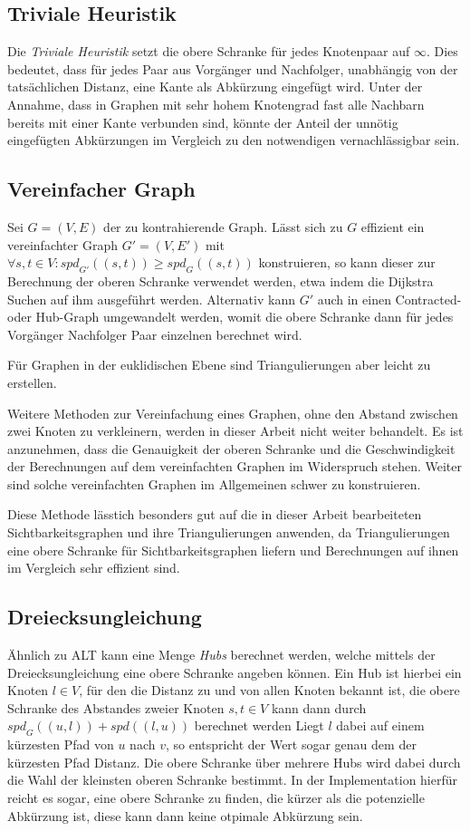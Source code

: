 \subsection{Triviale Heuristik}
Die \emph{Triviale Heuristik} setzt die obere Schranke für jedes Knotenpaar auf $\infty$.
Dies bedeutet, dass für jedes Paar aus Vorgänger und Nachfolger, unabhängig von der tatsächlichen Distanz, eine Kante als Abkürzung eingefügt wird.
Unter der Annahme, dass in Graphen mit sehr hohem Knotengrad fast alle Nachbarn bereits mit einer Kante verbunden sind, könnte der Anteil der unnötig eingefügten Abkürzungen im Vergleich zu den notwendigen vernachlässigbar sein.

\subsection{Vereinfacher Graph}
Sei $G = (V, E)$ der zu kontrahierende Graph.
Lässt sich zu $G$ effizient ein vereinfachter Graph $G' = (V, E')$ mit $\forall s, t \in V \colon {spd}_{G'} ((s, t)) \geq {spd}_{G} ((s, t))$ konstruieren, so kann dieser zur Berechnung der oberen Schranke verwendet werden, etwa indem die Dijkstra Suchen auf ihm ausgeführt werden.
Alternativ kann $G'$ auch in einen Contracted- oder Hub-Graph umgewandelt werden, womit die obere Schranke dann für jedes Vorgänger Nachfolger Paar einzelnen berechnet wird.

Für Graphen in der euklidischen Ebene sind Triangulierungen aber leicht zu erstellen.

Weitere Methoden zur Vereinfachung eines Graphen, ohne den Abstand zwischen zwei Knoten zu verkleinern, werden in dieser Arbeit nicht weiter behandelt.
Es ist anzunehmen, dass die Genauigkeit der oberen Schranke und die Geschwindigkeit der Berechnungen auf dem vereinfachten Graphen im Widerspruch stehen.
Weiter sind solche vereinfachten Graphen im Allgemeinen schwer zu konstruieren.

Diese Methode lässtich besonders gut auf die in dieser Arbeit bearbeiteten Sichtbarkeitsgraphen und ihre Triangulierungen anwenden, da Triangulierungen eine obere Schranke für Sichtbarkeitsgraphen liefern und Berechnungen auf ihnen im Vergleich sehr effizient sind.

\subsection{Dreiecksungleichung}
Ähnlich zu ALT\cite{goldberg2005computing} kann eine Menge \emph{Hubs} berechnet werden, welche mittels der Dreiecksungleichung eine obere Schranke angeben können.
Ein Hub ist hierbei ein Knoten $l \in V$, für den die Distanz zu und von allen Knoten bekannt ist, die obere Schranke des Abstandes zweier Knoten $s, t \in V$ kann dann durch ${spd}_G ((u, l)) + {spd}((l, u))$ berechnet werden
Liegt $l$ dabei auf einem kürzesten Pfad von $u$ nach $v$, so entspricht der Wert sogar genau dem der kürzesten Pfad Distanz.
Die obere Schranke über mehrere Hubs wird dabei durch die Wahl der kleinsten oberen Schranke bestimmt.
In der Implementation hierfür reicht es sogar, eine obere Schranke zu finden, die kürzer als die potenzielle Abkürzung ist, diese kann dann keine otpimale Abkürzung sein.

